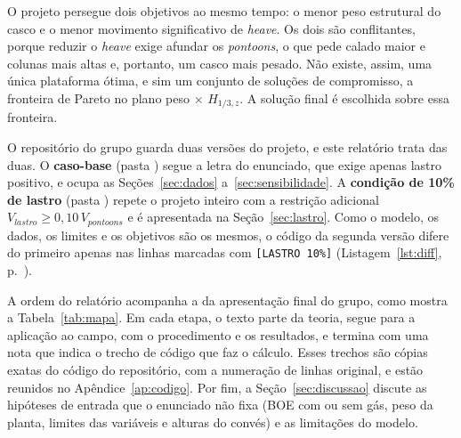 \documentclass[11pt,a4paper]{article}
\newcommand{\lst}[1]{Listagem~\ref{lst:#1}, p.~\pageref{lst:#1}}
\newcommand{\Hz}{H_{1/3,z}}
\begin{document}
O projeto persegue dois objetivos ao mesmo tempo: o menor peso estrutural do casco e o menor
movimento significativo de \emph{heave}. Os dois são conflitantes, porque reduzir o \emph{heave}
exige afundar os \emph{pontoons}, o que pede calado maior e colunas mais altas e, portanto, um
casco mais pesado. Não existe, assim, uma única plataforma ótima, e sim um conjunto de soluções
de compromisso, a fronteira de Pareto no plano peso $\times$ $\Hz$. A solução final é escolhida
sobre essa fronteira.

O repositório do grupo guarda duas versões do projeto, e este relatório trata das duas. O
\textbf{caso-base} (pasta ) segue a letra do enunciado, que exige apenas lastro
positivo, e ocupa as Seções~\ref{sec:dados} a~\ref{sec:sensibilidade}. A \textbf{condição de 10\%
de lastro} (pasta ) repete o projeto inteiro com a restrição
adicional $V_{lastro} \ge 0{,}10\,V_{pontoons}$ e é apresentada na Seção~\ref{sec:lastro}. Como o
modelo, os dados, os limites e os objetivos são os mesmos, o código da segunda versão difere do
primeiro apenas nas linhas marcadas com \texttt{[LASTRO 10\%]} (\lst{diff}).

A ordem do relatório acompanha a da apresentação final do grupo, como mostra a
Tabela~\ref{tab:mapa}. Em cada etapa, o texto parte da teoria, segue para a aplicação ao campo,
com o procedimento e os resultados, e termina com uma nota que indica o trecho de código que faz
o cálculo. Esses trechos são cópias exatas do código do repositório, com a numeração de linhas
original, e estão reunidos no Apêndice~\ref{ap:codigo}. Por fim, a Seção~\ref{sec:discussao}
discute as hipóteses de entrada que o enunciado não fixa (BOE com ou sem gás, peso da planta,
limites das variáveis e alturas do convés) e as limitações do modelo.
\end{document}
